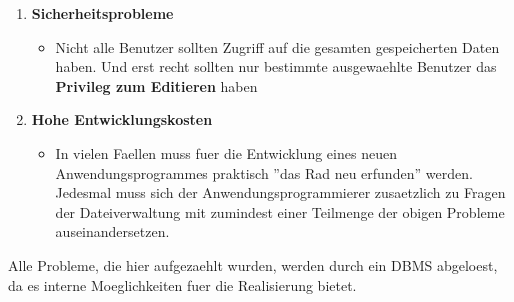 \documentclass[a4paper,10pt]{article}
\begin{document}
\begin{enumerate}
\begin{itemize}
\end{itemize}
\item \textbf{Sicherheitsprobleme}
\begin{itemize}
\item Nicht alle Benutzer sollten Zugriff auf die gesamten gespeicherten Daten haben. Und erst recht sollten nur bestimmte ausgewaehlte Benutzer das \textbf{Privileg zum Editieren} haben
\end{itemize}
\item \textbf{Hohe Entwicklungskosten}
\begin{itemize}
\item In vielen Faellen muss fuer die Entwicklung eines neuen Anwendungsprogrammes praktisch ''das Rad neu erfunden'' werden. Jedesmal muss sich der Anwendungsprogrammierer zusaetzlich zu Fragen der Dateiverwaltung mit zumindest einer Teilmenge der obigen Probleme auseinandersetzen.
\end{itemize}
\end{enumerate}
Alle Probleme, die hier aufgezaehlt wurden, werden durch ein DBMS abgeloest, da es interne Moeglichkeiten fuer die Realisierung bietet.
\end{document}

